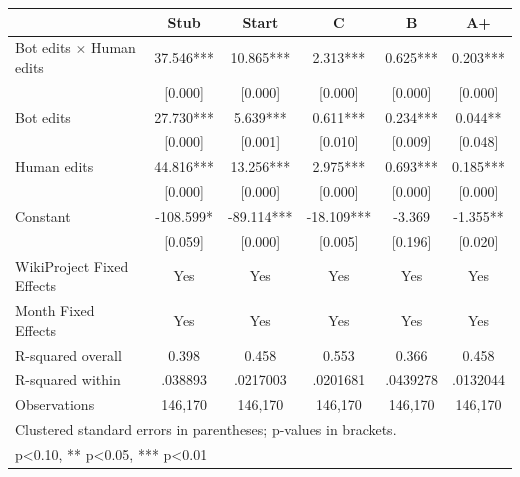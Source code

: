{
\def\sym#1{\ifmmode^{#1}\else\(^{#1}\)\fi}
\begin{tabular}{l*{5}{c}}
\toprule
                    &\multicolumn{1}{c}{Stub}&\multicolumn{1}{c}{Start}&\multicolumn{1}{c}{C}&\multicolumn{1}{c}{B}&\multicolumn{1}{c}{A+}\\
\midrule
Bot edits $\times$ Human edits&    37.546***&    10.865***&     2.313***&     0.625***&     0.203***\\
                    &   [0.000]   &   [0.000]   &   [0.000]   &   [0.000]   &   [0.000]   \\
Bot edits           &    27.730***&     5.639***&     0.611***&     0.234***&     0.044** \\
                    &   [0.000]   &   [0.001]   &   [0.010]   &   [0.009]   &   [0.048]   \\
Human edits         &    44.816***&    13.256***&     2.975***&     0.693***&     0.185***\\
                    &   [0.000]   &   [0.000]   &   [0.000]   &   [0.000]   &   [0.000]   \\
Constant            &  -108.599*  &   -89.114***&   -18.109***&    -3.369   &    -1.355** \\
                    &   [0.059]   &   [0.000]   &   [0.005]   &   [0.196]   &   [0.020]   \\
WikiProject Fixed Effects&       Yes   &       Yes   &       Yes   &       Yes   &       Yes   \\
Month Fixed Effects &       Yes   &       Yes   &       Yes   &       Yes   &       Yes   \\
\midrule
R-squared overall   &     0.398   &     0.458   &     0.553   &     0.366   &     0.458   \\
R-squared within    &   .038893   &  .0217003   &  .0201681   &  .0439278   &  .0132044   \\
Observations        &   146,170   &   146,170   &   146,170   &   146,170   &   146,170   \\
\bottomrule
\multicolumn{6}{l}{\footnotesize Clustered standard errors in parentheses; p-values in brackets.}\\
\multicolumn{6}{l}{\footnotesize * p<0.10, ** p<0.05, *** p<0.01}\\
\end{tabular}
}
